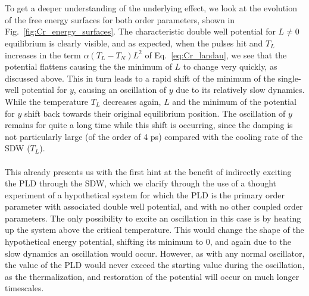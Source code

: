 \\\\
To get a deeper understanding of the underlying effect, we look at the evolution of the free energy surfaces for both order parameters, shown in Fig.~\ref{fig:Cr_energy_surfaces}.
The characteristic double well potential for $L\neq0$ equilibrium is clearly visible, and as expected, when the pulses hit and $T_L$ increases in the term $\alpha(T_L-T_N)L^2$ of Eq.~\eqref{eq:Cr_landau}, we see that the potential flattens causing the the minimum of $L$ to change very quickly, as discussed above.
This in turn leads to a rapid shift of the minimum of the single-well potential for $y$, causing an oscillation of $y$ due to its relatively slow dynamics.
While the temperature $T_L$ decreases again, $L$ and the minimum of the potential for $y$ shift back towards their original equilibrium position.
The oscillation of $y$ remains for quite a long time while this shift is occurring, since the damping is not particularly large (of the order of 4 ps) compared with the cooling rate of the SDW ($T_L$).
\\\\
This already presents us with the first hint at the benefit of indirectly exciting the PLD through the SDW, which we clarify through the use of a thought experiment of a hypothetical system for which the PLD is the primary order parameter with associated double well potential, and with no other coupled order parameters.
The only possibility to excite an oscillation in this case is by heating up the system above the critical temperature.
This would change the shape of the hypothetical energy potential, shifting its minimum to 0, and again due to the slow dynamics an oscillation would occur.
However, as with any normal oscillator, the value of the PLD would never exceed the starting value during the oscillation, as the thermalization, and restoration of the potential will occur on much longer timescales.

